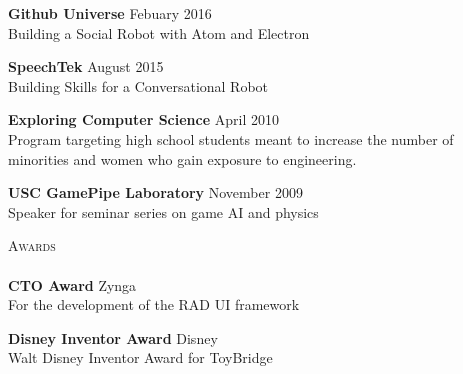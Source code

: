 \documentclass[a4paper]{article}
\newcommand{\lineunder} {
    \vspace*{-8pt} \\
    \hspace*{-18pt} \hrulefill \\
}
\newcommand{\header} [1] {
    {\hspace*{-18pt}\vspace*{6pt} \textsc{#1}}
    \vspace*{-6pt} \lineunder
}
\begin{document}
\textbf{Github Universe} \hfill Febuary 2016\\
Building a Social Robot with Atom and Electron 
\vspace*{2mm}

\textbf{SpeechTek} \hfill August 2015\\
Building Skills for a Conversational Robot 
\vspace*{2mm}

\textbf{Exploring Computer Science} \hfill April 2010\\
Program targeting high school students meant to increase the number of
minorities and women who gain exposure to engineering.
\vspace*{2mm}

\textbf{USC GamePipe Laboratory} \hfill November 2009\\
Speaker for seminar series on game AI and physics 
\vspace*{4mm}

\header{Awards}

\textbf{CTO Award} \hfill Zynga\\
For the development of the RAD UI framework 
\vspace*{2mm}

\textbf{Disney Inventor Award} \hfill Disney\\
Walt Disney Inventor Award for ToyBridge
\vspace*{2mm}

\ 
\end{document}
